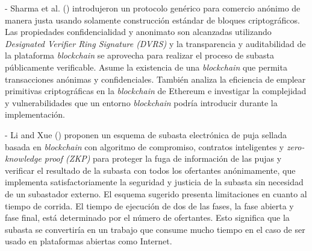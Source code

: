     - Sharma et al. (\citeyear{sharma2021}) introdujeron un protocolo genérico para comercio anónimo de 
    manera justa usando solamente construcción estándar de bloques criptográficos. Las propiedades confidencialidad y anonimato son alcanzadas utilizando 
    \textit{Designated Verifier Ring
    Signature (DVRS)} y la transparencia y auditabilidad de la plataforma \textit{blockchain} se aprovecha 
    para realizar el proceso de subasta
    públicamente verificable. Asume la existencia de una \textit{blockchain} que permita transacciones 
    anónimas y confidenciales.
    También analiza la eficiencia de emplear primitivas criptográficas en la \textit{blockchain} de 
    Ethereum e investigar la complejidad
    y vulnerabilidades que un entorno \textit{blockchain} podría introducir durante la implementación.


    - Li and Xue (\citeyear{li2021}) proponen un esquema de subasta electrónica de puja sellada basada en \textit{blockchain} con algoritmo de 
    compromiso, contratos inteligentes y \textit{zero-knowledge proof (ZKP)} para proteger la fuga de información de las pujas y verificar
    el resultado de la subasta con todos los ofertantes anónimamente, que implementa satisfactoriamente la seguridad y justicia de la 
    subasta sin necesidad de un subastador externo. El esquema sugerido presenta limitaciones en cuanto al 
    tiempo de corrida. El tiempo 
    de ejecución de dos de las fases, la fase abierta y fase final, está determinado por el número de 
    ofertantes. Esto significa que 
    la subasta se convertiría en un trabajo que consume mucho tiempo en el caso de ser usado en 
    plataformas abiertas como Internet.


